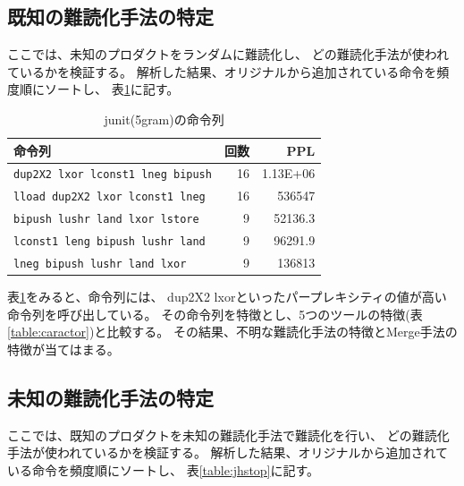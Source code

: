 \documentclass[a4j,fleqn,10pt]{jarticle}
\begin{document}
\subsection{既知の難読化手法の特定}
ここでは、未知のプロダクトをランダムに難読化し、
どの難読化手法が使われているかを検証する。
解析した結果、オリジナルから追加されている命令を頻度順にソートし、
表\ref{table:junit}に記す。
\begin{table}[t]
  \centering
  \footnotesize{
    \caption{junit(5gram)の命令列}\label{table:junit}
  \begin{tabular}{l|r|r}
    命令列 & 
    回数 & 
    PPL \\ \hline
    \texttt{dup2X2 lxor lconst1 lneg bipush}     & 16 & 1.13E+06 \\
    \texttt{lload dup2X2 lxor lconst1 lneg}      & 16 & 536547 \\
    \texttt{bipush lushr land lxor lstore}       &  9 & 52136.3 \\
    \texttt{lconst1 leng bipush lushr land}      &  9 & 96291.9 \\
    \texttt{lneg bipush lushr land lxor}         &  9 & 136813 \\
  \end{tabular}}
\end{table}

表\ref{table:junit}をみると、命令列には、
dup2X2 lxorといったパープレキシティの値が高い命令列を呼び出している。
その命令列を特徴とし、5つのツールの特徴(表\ref{table:caractor})と比較する。
その結果、不明な難読化手法の特徴とMerge手法の特徴が当てはまる。

\subsection{未知の難読化手法の特定}
ここでは、既知のプロダクトを未知の難読化手法で難読化を行い、
どの難読化手法が使われているかを検証する。
解析した結果、オリジナルから追加されている命令を頻度順にソートし、
表\ref{table:jhstop}に記す。
\end{document}
